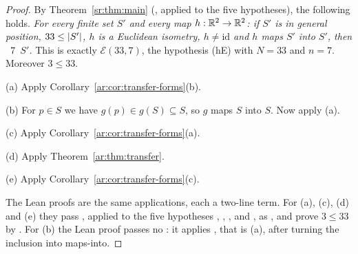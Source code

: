 \begin{proof}
By Theorem~\ref{sr:thm:main} (, applied to the five hypotheses), the following
holds. \emph{For every finite set $S'$ and every map $h:\mathbb R^2\to\mathbb R^2$: if $S'$ is in general position, $33\le\lvert S'\rvert$,
$h$ is a Euclidean isometry, $h\ne\mathrm{id}$ and $h$ maps $S'$ into $S'$, then ~$7$~$S'$.} This is
exactly $\mathcal E(33,7)$, the hypothesis (hE) with $N=33$ and $n=7$. Moreover $3\le33$.

(a) Apply Corollary~\ref{ar:cor:transfer-forms}(b).

(b) For $p\in S$ we have $g(p)\in g(S)\subseteq S$, so $g$ maps $S$ into $S$. Now apply (a).

(c) Apply Corollary~\ref{ar:cor:transfer-forms}(a).

(d) Apply Theorem~\ref{ar:thm:transfer}.

(e) Apply Corollary~\ref{ar:cor:transfer-forms}(c).

The Lean proofs are the same applications, each a two-line term. For (a), (c), (d) and (e) they pass
, applied to the five hypotheses , , ,  and
, as , and prove $3\le33$ by . For (b) the Lean proof passes no : it applies
, that is (a), after turning the inclusion into maps-into.
\end{proof}

